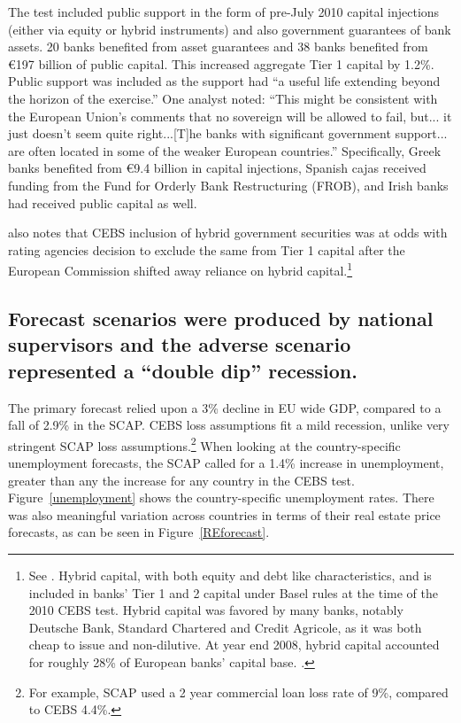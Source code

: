 \documentclass[12pt]{article}
\begin{document}
The test included public support in the form of pre-July 2010 capital injections (either via equity or hybrid instruments) and also government guarantees of bank assets. 20 banks benefited from asset guarantees and 38 banks benefited from \euro{197} billion of public capital. This increased aggregate Tier 1 capital by 1.2\%. Public support was included as the support had ``a useful life extending beyond the horizon of the exercise.'' One analyst noted: ``This might be consistent with the European Union's comments that no sovereign will be allowed to fail, but... it just doesn't seem quite right...[T]he banks with significant government support... are often located in some of the weaker European countries.'' \citep{Alloway} Specifically, Greek banks benefited from \euro{9.4} billion in capital injections, Spanish cajas received funding from the Fund for Orderly Bank Restructuring (FROB), and Irish banks had received public capital as well.

\citet{Alloway} also notes that CEBS inclusion of hybrid government securities was at odds with rating agencies decision to exclude the same from Tier 1 capital after the European Commission shifted away reliance on hybrid capital.\footnote{See \citet{Fitch}. Hybrid capital, with both equity and debt like characteristics, and is included in banks' Tier 1 and 2 capital under Basel rules at the time of the 2010 CEBS test. Hybrid capital was favored by many banks, notably Deutsche Bank, Standard Chartered and Credit Agricole, as it was both cheap to issue and non-dilutive. At year end 2008, hybrid capital accounted for roughly 28\% of European banks' capital base. \citep{Alloway2}.}

\subsection{Forecast scenarios were produced by national supervisors and the adverse scenario represented a ``double dip'' recession.}

The primary forecast relied upon a 3\% decline in EU wide GDP, compared to a fall of 2.9\% in the SCAP. CEBS loss assumptions fit a mild recession, unlike very stringent SCAP loss assumptions.\footnote{For example, SCAP used a 2 year commercial loan loss rate of 9\%, compared to CEBS 4.4\%.} When looking at the country-specific unemployment forecasts, the SCAP called for a 1.4\% increase in unemployment, greater than any the increase for any country in the CEBS test. Figure~\ref{unemployment} shows the country-specific unemployment rates. There was also meaningful variation across countries in terms of their real estate price forecasts, as can be seen in Figure~\ref{REforecast}.
\end{document}
